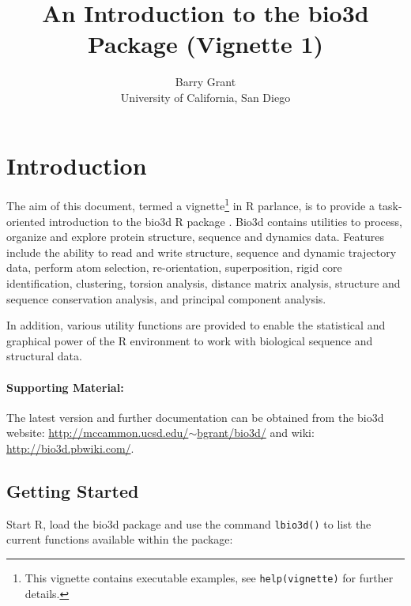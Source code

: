 \documentclass[a4paper]{article}
\title{An Introduction to the bio3d Package (Vignette 1)}
\author{Barry Grant\\
University of California, San Diego}
\begin{document}
\maketitle
\tableofcontents


\section{Introduction}
The aim of this document, termed a vignette\footnote{This vignette contains executable examples, see \texttt{help(vignette)} for further details.} in R parlance, is to provide a task-oriented introduction to the bio3d R package \citep{grant06}.  Bio3d contains utilities to process, organize and explore protein structure, sequence and dynamics data.  Features include the ability to read and write structure, sequence and dynamic trajectory data, perform atom selection, re-orientation, superposition, rigid core identification, clustering, torsion analysis, distance matrix analysis, structure and sequence conservation analysis, and principal component analysis.

In addition, various utility functions are provided to enable the statistical and graphical power of the R environment to work with biological sequence and structural data.  




\paragraph{Supporting Material:}
The latest version and further documentation can be obtained from the bio3d website: \href{http://mccammon.ucsd.edu/~bgrant/bio3d/}{http://mccammon.ucsd.edu/$\sim$bgrant/bio3d/} and wiki: \href{http://bio3d.pbwiki.com/}{http://bio3d.pbwiki.com/}.




\subsection{Getting Started}
Start R, load the bio3d package and use the command \texttt{lbio3d()} to list the current functions available within the package:
\end{document}
